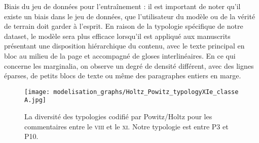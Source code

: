 \documentclass[a4paper, twoside, 12pt]{book}
\begin{document}
\begin{table}[H]
\centering
{}
\caption{Jeu de données pour l'entraînement des modèle de segmentation sémantique YALTAi - kraken}
\label{tab:dataset_segmentation}
\end{table}



Biais du jeu de données pour l'entraînement : il est important de noter qu'il existe un biais dans le jeu de données, que l'utilisateur du modèle ou de la vérité de terrain doit garder à l'esprit. En raison de la typologie spécifique de notre dataset, le modèle sera plus efficace lorsqu'il est appliqué aux manuscrits présentant une disposition hiérarchique du contenu, avec le texte principal en bloc au milieu de la page et accompagné de gloses interlinéaires. En ce qui concerne les marginalia, on observe un degré de densité différent, avec des lignes éparses, de petits blocs de texte ou même des paragraphes entiers en marge.\\


\begin{figure}[H]
    \centering
    \texttt{[image: modelisation\_graphs/Holtz\_Powitz\_typologyXIe\_classe A.jpg]}
    \caption{La diversité des typologies codifié par Powitz/Holtz pour les commentaires entre le \textsc{viii}\ieme{} et le \textsc{xi}\ieme{}. Notre typologie est entre P3 et P10.}
    \label{typologies}
\end{figure}
\end{document}
